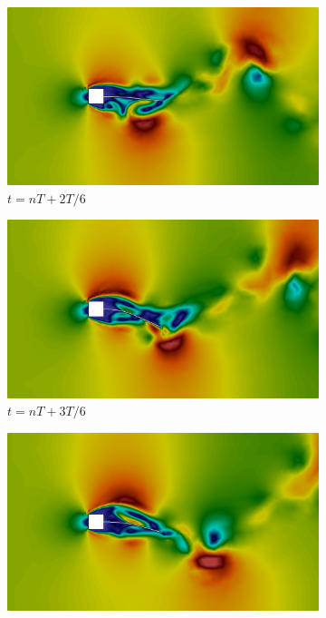 \begin{figure}[h!]
\begin{subfigure}[b]{0.32\textwidth}
        \includegraphics[width=\linewidth]{Figuras/FSI-prism2/vT3.png}
        \caption{$t=nT+2T/6$}
    \end{subfigure}
    \begin{subfigure}[b]{0.32\textwidth}
        \includegraphics[width=\linewidth]{Figuras/FSI-prism2/vT4.png}
        \caption{$t=nT+3T/6$}
    \end{subfigure}
    \begin{subfigure}[b]{0.32\textwidth}
        \includegraphics[width=\linewidth]{Figuras/FSI-prism2/vT5.png}

\end{subfigure}
\end{figure}
